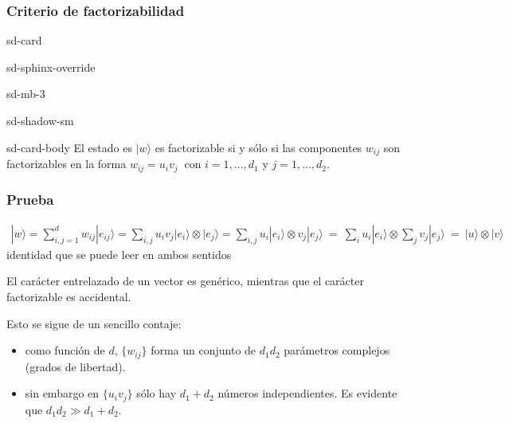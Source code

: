 \documentclass[letterpaper,10pt,english]{jupyterBook}
\newcommand{\ket}[1]{|#1\rangle}
\begin{document}
\subsubsection{Criterio de factorizabilidad}
\label{\detokenize{docs/Part_01_Formalismo/Chapter_01_02_Formalismo_matem_xe1tico/01_04_Tensores_myst:criterio-de-factorizabilidad}}
\begin{sphinxuseclass}{sd-card}
\begin{sphinxuseclass}{sd-sphinx-override}
\begin{sphinxuseclass}{sd-mb-3}
\begin{sphinxuseclass}{sd-shadow-sm}
\begin{sphinxuseclass}{sd-card-body}
\sphinxAtStartPar
El estado es \(\ket{w}\) es factorizable si y sólo si las componentes \(w_{ij}\) son factorizables en la forma \(w_{ij} = u_i v_j~\) con \(i=1,...,d_1\) y \(j = 1,...,d_2\).

\end{sphinxuseclass}
\end{sphinxuseclass}
\end{sphinxuseclass}
\end{sphinxuseclass}
\end{sphinxuseclass}\subsubsection*{Prueba}
\begin{equation*}
\begin{split}
\ket{w}= \sum_{i,j=1}^d w_{ij} \ket{e_{ij}}  = \sum_{i,j} u_{i}v_j \ket{e_i}\otimes \ket{e_j}= \sum_{i,j} u_{i} \ket{e_i}\otimes v_j\ket{e_j}  ~ =~ \sum_i u_i\ket{e_i} \otimes \sum_j v_j\ket{e_j} ~=~   \ket{u}\otimes \ket{v}
\end{split}
\end{equation*}
\sphinxAtStartPar
identidad que se puede leer en ambos sentidos

\sphinxAtStartPar
El carácter entrelazado de un vector es genérico, mientras que el carácter factorizable es accidental.

\sphinxAtStartPar
Esto se sigue de un sencillo contaje:
\begin{itemize}
\item {} 
\sphinxAtStartPar
como función de \(d\),  \(\{w_{ij}\}\) forma un conjunto de \(d_1d_2\) parámetros complejos (grados de libertad).

\item {} 
\sphinxAtStartPar
sin embargo en \(\{u_i v_j\}\) sólo hay \(d_1 + d_2\) números independientes. Es evidente que \(d_1 d_2 \gg d_1 + d_2\).

\end{itemize}
\end{document}
